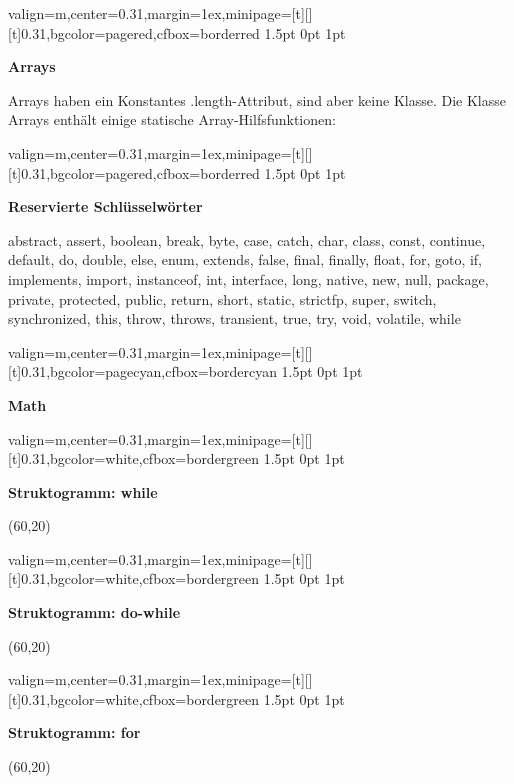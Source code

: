 \documentclass[11pt, a4paper, landscape]{article}
\newcommand{\fancyheader}[1]{
	\centerline{\sffamily \textbf{ \large #1}}
}
\newenvironment{fancybox}[2]
{
	\begin{adjustbox}{valign=m,center=0.31\textwidth,margin=1ex,minipage=[t][][t]{0.31\textwidth},bgcolor=#1,cfbox=#2 1.5pt 0pt 1pt}
	\begin{centering}
}
{
	\end{centering}
	\end{adjustbox}
}
\begin{document}
\begin{multicols}{3}
\begin{fancybox}{pagered}{borderred}
\fancyheader{Arrays}
\raggedright {
	Arrays haben ein Konstantes {\ttfamily .length}-Attribut, sind aber keine Klasse. Die Klasse {\ttfamily Arrays} enthält einige statische Array-Hilfsfunktionen:
}

\end{fancybox}

\begin{fancybox}{pagered}{borderred}
\fancyheader{Reservierte Schlüsselwörter}
{\ttfamily abstract, assert, boolean, break, byte, case, catch, char, class, const, continue, default, do, double, else, enum, extends, false, final, finally, float, for, goto, if, implements, import, instanceof, int, interface, long, native, new, null, package, private, protected, public, return, short, static, strictfp, super, switch, synchronized, this, throw, throws, transient, true, try, void, volatile, while}
\end{fancybox}

\begin{fancybox}{pagecyan}{bordercyan}
\fancyheader{Math}

\end{fancybox}

\begin{fancybox}{white}{bordergreen}
\fancyheader{Struktogramm: while}
\vspace{10pt}
\begin{center}
\begin{struktogramm}(60,20)
	\whileend
\end{struktogramm}
\end{center}
\end{fancybox}

\begin{fancybox}{white}{bordergreen}
\fancyheader{Struktogramm: do-while}
\vspace{10pt}
\begin{center}
\begin{struktogramm}(60,20)
	\untilend
\end{struktogramm}
\end{center}
\end{fancybox}

\begin{fancybox}{white}{bordergreen}
\fancyheader{Struktogramm: for}
\vspace{10pt}
\begin{center}
\begin{struktogramm}(60,20)
	\whileend
\end{struktogramm}
\end{center}
\end{fancybox}


\end{multicols}
\end{document}
